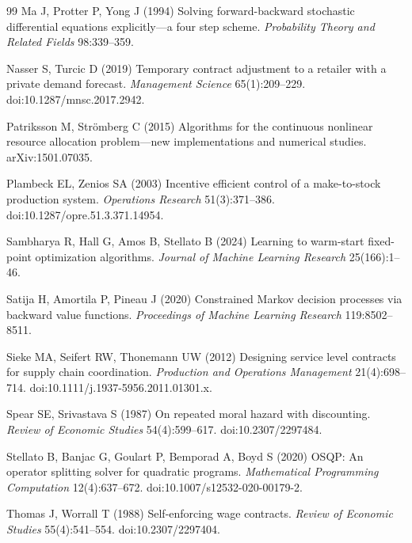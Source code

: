 \documentclass[11pt,letterpaper]{article}
\theoremstyle{definition}
\newcommand{\1}{\mathbf 1}
\begin{document}
\begin{thebibliography}{99}
Ma J, Protter P, Yong J (1994) Solving forward-backward stochastic differential equations explicitly---a four step scheme. \emph{Probability Theory and Related Fields} 98:339--359.

Nasser S, Turcic D (2019) Temporary contract adjustment to a retailer with a private demand forecast. \emph{Management Science} 65(1):209--229. doi:10.1287/mnsc.2017.2942.


Patriksson M, Str\"omberg C (2015) Algorithms for the continuous nonlinear resource allocation problem---new implementations and numerical studies. arXiv:1501.07035.

Plambeck EL, Zenios SA (2003) Incentive efficient control of a make-to-stock production system. \emph{Operations Research} 51(3):371--386. doi:10.1287/opre.51.3.371.14954.

Sambharya R, Hall G, Amos B, Stellato B (2024) Learning to warm-start fixed-point optimization algorithms. \emph{Journal of Machine Learning Research} 25(166):1--46.

Satija H, Amortila P, Pineau J (2020) Constrained Markov decision processes via backward value functions. \emph{Proceedings of Machine Learning Research} 119:8502--8511.

Sieke MA, Seifert RW, Thonemann UW (2012) Designing service level contracts for supply chain coordination. \emph{Production and Operations Management} 21(4):698--714. doi:10.1111/j.1937-5956.2011.01301.x.

Spear SE, Srivastava S (1987) On repeated moral hazard with discounting. \emph{Review of Economic Studies} 54(4):599--617. doi:10.2307/2297484.

Stellato B, Banjac G, Goulart P, Bemporad A, Boyd S (2020) OSQP: An operator splitting solver for quadratic programs. \emph{Mathematical Programming Computation} 12(4):637--672. doi:10.1007/s12532-020-00179-2.

Thomas J, Worrall T (1988) Self-enforcing wage contracts. \emph{Review of Economic Studies} 55(4):541--554. doi:10.2307/2297404.


\end{thebibliography}
\end{document}
